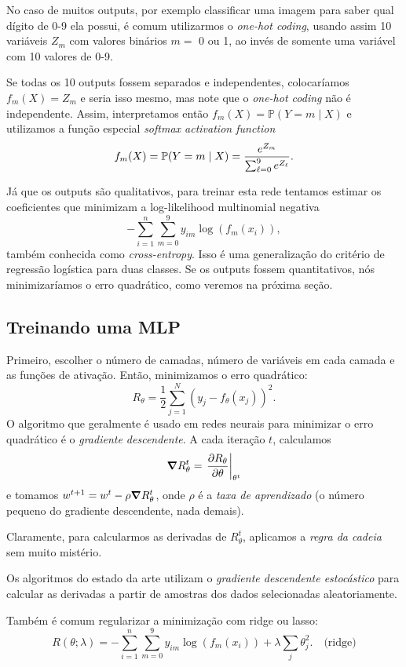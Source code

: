 \documentclass[a4paper,fleqn,12pt]{article}
\begin{document}
No caso de muitos outputs, por exemplo classificar uma imagem para saber qual dígito de 0-9 ela possui, é comum utilizarmos o \textit{one-hot coding}, usando assim 10 variáveis $Z_m$ com valores binários $m =$ 0 ou 1, ao invés de somente uma variável com 10 valores de 0-9.

Se todas os 10 outputs fossem separados e independentes, colocaríamos $f_m(X) = Z_m$ e seria isso mesmo, mas note que o \textit{one-hot coding} não é independente. Assim, interpretamos então $f_m(X) = \mathbb{P}(Y = m \mid X)$ e utilizamos a função especial \textit{softmax activation function}
$$
f_m(X) = \P(Y = m \mid X) = \frac{e^{Z_m}}{\sum_{\ell = 0}^9 e^{Z_\ell}}.
$$

Já que os outputs são qualitativos, para treinar esta rede tentamos estimar os coeficientes que minimizam a log-likelihood multinomial negativa
$$
- \sum_{i=1}^{n} \sum_{m=0}^{9} y_{im} \log(f_m(x_i)),
$$
também conhecida como \textit{cross-entropy}. Isso é uma generalização do critério de regressão logística para duas classes. Se os outputs fossem quantitativos, nós minimizaríamos o erro quadrático, como veremos na próxima seção.

\subsection{Treinando uma MLP}

Primeiro, escolher o número de camadas, número de variáveis em cada camada e as funções de ativação. Então, minimizamos o erro quadrático:
$$
R_\theta = \frac{1}{2} \sum_{j=1}^{N} (y_j - f_\theta(x_j))^2.
$$
O algoritmo que geralmente é usado em redes neurais para minimizar o erro quadrático é o \textit{gradiente descendente}. A cada iteração $t$, calculamos
$$
\grad{R_\theta^t} = \eval{\pdv{R_\theta}{\theta}}_{\theta^t}
$$
e tomamos $w^{t+1} = w^t - \rho \grad{R_\theta^t}$, onde $\rho$ é a \textit{taxa de aprendizado} (o número pequeno do gradiente descendente, nada demais).

Claramente, para calcularmos as derivadas de $R_\theta^t$, aplicamos a \textit{regra da cadeia} sem muito mistério.

Os algoritmos do estado da arte utilizam o \textit{gradiente descendente estocástico} para calcular as derivadas a partir de amostras dos dados selecionadas aleatoriamente.

Também é comum regularizar a minimização com ridge ou lasso:
$$
R(\theta; \lambda) = - \sum_{i=1}^{n} \sum_{m=0}^{9} y_{im} \log(f_m(x_i)) +
\lambda \sum_j \theta_j^2. \quad \text{(ridge)}
$$
\end{document}
